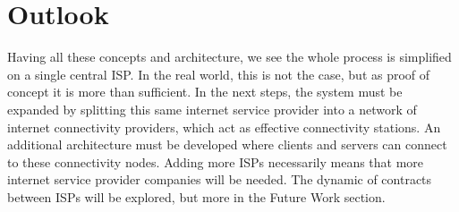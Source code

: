 \section{Outlook}
Having all these concepts and architecture, we see the whole process is simplified on a single central ISP. In the real world, this is not the case, but as proof of concept it is more than sufficient. In the next steps, the system must be expanded by splitting this same internet service provider into a network of internet connectivity providers, which act as effective connectivity stations. An additional architecture must be developed where clients and servers can connect to these connectivity nodes. Adding more ISPs necessarily means that more internet service provider companies will be needed. The dynamic of contracts between ISPs will be explored, but more in the Future Work section.